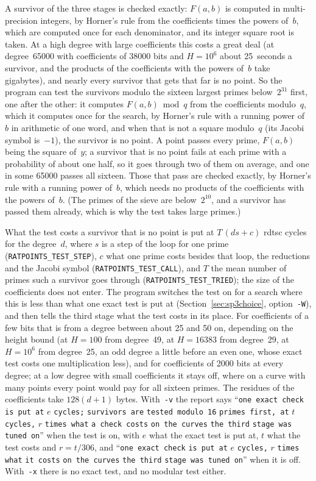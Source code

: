 \documentclass[12pt,a4paper,oneside]{amsart}
\begin{document}
A survivor of the three stages is checked exactly: $F(a, b)$ is computed
in multi-precision integers, by Horner's rule from the coefficients times
the powers of~$b$, which are computed once for each denominator, and its
integer square root is taken. At a high degree with large coefficients
this costs a great deal (at degree~65000 with coefficients of 38000 bits
and $H = 10^6$ about 25~seconds a survivor, and the products of the
coefficients with the powers of~$b$ take gigabytes), and nearly every
survivor that gets that far is no point. So the program can test the
survivors modulo the sixteen largest primes below~$2^{31}$ first, one
after the other: it computes $F(a, b) \bmod q$ from the coefficients
modulo~$q$, which it computes once for the search, by Horner's rule with a
running power of~$b$ in arithmetic of one word, and when that is not a
square modulo~$q$ (its Jacobi symbol is~$-1$), the survivor is no point.
A point passes every prime, $F(a, b)$ being the square of~$y$; a survivor
that is no point fails at each prime with a probability of about one
half, so it goes through two of them on average, and one in some 65000
passes all sixteen. Those that pass are checked exactly, by Horner's rule
with a running power of~$b$, which needs no products of the coefficients
with the powers of~$b$. (The primes of the sieve are below~$2^{10}$, and a
survivor has passed them already, which is why the test takes large
primes.)

What the test costs a survivor that is no point is put at
$T\,(d s + c)$ rdtsc cycles for the degree~$d$, where $s$ is a step of
the loop for one prime (\texttt{RATPOINTS\_TEST\_STEP}), $c$ what one
prime costs besides that loop, the reductions and the Jacobi symbol
(\texttt{RATPOINTS\_TEST\_CALL}), and $T$ the mean number of primes such a
survivor goes through (\texttt{RATPOINTS\_TEST\_TRIED}); the size of the
coefficients does not enter. The program switches the test on for a
search where this is less than what one exact test is put at
(Section~\ref{sec:sp3choice}, option~\verb+-W+), and then tells the third
stage what the test costs in its place. For coefficients of a few bits
that is from a degree between about 25 and 50 on, depending on the
height bound (at $H = 100$ from degree~49, at $H = 16383$ from
degree~29, at $H = 10^6$ from degree~25, an odd degree a little before
an even one, whose exact test costs one multiplication less), and for
coefficients of 2000 bits at every degree; at a low
degree with small coefficients it stays off, where on a curve with many
points every point would pay for all sixteen primes. The residues of the
coefficients take $128(d + 1)$ bytes. With~\verb+-v+ the report says
``\verb+one exact check is put at+ $e$ \verb+cycles;+ \verb+survivors are+
\verb+tested modulo 16+ \verb+primes first, at+ $t$ \verb+cycles,+ $r$
\verb+times what+ \verb+a check costs+ \verb+on the curves+ \verb+the third+
\verb+stage was tuned on+'' when the test is on, with $e$ what the exact
test is put at, $t$ what the test costs and $r = t/306$, and
``\verb+one exact check+ \verb+is put at+ $e$ \verb+cycles,+ $r$
\verb+times what+ \verb+it costs+ \verb+on the curves+ \verb+the third+
\verb+stage was tuned on+'' when it is off. With~\verb+-x+ there is no
exact test, and no modular test either.
\end{document}
